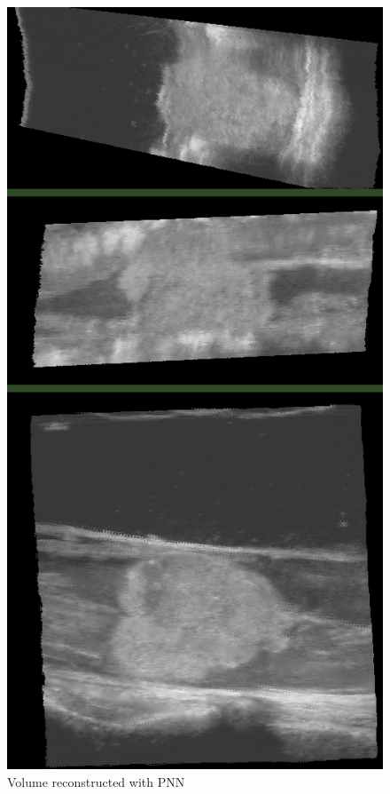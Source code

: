 \begin{figure}
\begin{minipage}[b]{0.326\textwidth}
	\centering
	\includegraphics[width=\textwidth]{graphics/large_pnn.png}
	\caption{Volume reconstructed with PNN}

\end{minipage}
\end{figure}
